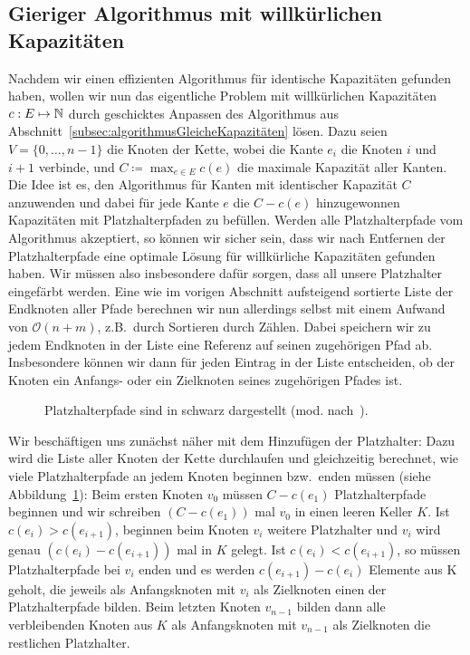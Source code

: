\subsection{Gieriger Algorithmus mit willkürlichen Kapazitäten}\label{subsec:anpassenAnWillkürlicheKapazitäten}

Nachdem wir einen effizienten Algorithmus für identische Kapazitäten gefunden haben, wollen wir nun das eigentliche Problem mit
willkürlichen Kapazitäten $c: E \mapsto \mathbb N$ durch geschicktes Anpassen des Algorithmus aus Abschnitt~\ref{subsec:algorithmusGleicheKapazitäten} lösen.
Dazu seien $V=\{0,\dots,n-1\}$ die Knoten der Kette, wobei die Kante $e_i$ die Knoten $i$ und $i+1$ verbinde, und $C \coloneqq \max_{e \in E} c(e)$ die maximale Kapazität aller Kanten.
Die Idee ist es, den Algorithmus für Kanten mit identischer Kapazität $C$ anzuwenden und dabei für jede Kante $e$ die $C - c(e)$
hinzugewonnen Kapazitäten mit Platzhalterpfaden zu befüllen.
Werden alle Platzhalterpfade vom Algorithmus akzeptiert, so können wir sicher sein, dass wir nach Entfernen der
Platzhalterpfade eine optimale Lösung für willkürliche Kapazitäten gefunden haben.
Wir müssen also insbesondere dafür sorgen, dass all unsere Platzhalter eingefärbt werden.
Eine wie im vorigen Abschnitt aufsteigend sortierte Liste der Endknoten aller Pfade berechnen wir nun allerdings selbst mit einem
Aufwand von $\mathcal O(n+m)$, z.B.\ durch Sortieren durch Zählen.
Dabei speichern wir zu jedem Endknoten in der Liste eine Referenz auf seinen zugehörigen Pfad ab.
Insbesondere können wir dann für jeden Eintrag in der Liste entscheiden, ob der Knoten ein Anfangs- oder ein Zielknoten seines zugehörigen Pfades ist.

\begin{figure}[htbp]
	\centering
	\def\svgwidth{250bp}
	
	\caption{Platzhalterpfade sind in schwarz dargestellt (mod. nach~\cite{paper}).}
	\label{fig:dummy-paths}
\end{figure}

Wir beschäftigen uns zunächst näher mit dem Hinzufügen der Platzhalter:
Dazu wird die Liste aller Knoten der Kette durchlaufen und gleichzeitig berechnet, wie viele Platzhalterpfade an jedem Knoten
beginnen bzw.\ enden müssen (siehe Abbildung~\ref{fig:dummy-paths}):
Beim ersten Knoten $v_0$ müssen $C - c(e_1)$ Platzhalterpfade beginnen und wir schreiben $(C - c(e_1))$ mal $v_0$ in einen
leeren Keller $K$.
Ist $c(e_i) > c(e_{i+1})$, beginnen beim Knoten $v_{i}$ weitere Platzhalter und $v_i$ wird genau $(c(e_i) - c(e_{i+1}))$ mal in $K$ gelegt.
Ist $c(e_i) < c(e_{i+1})$, so müssen Platzhalterpfade bei $v_i$ enden und es werden $c(e_{i+1}) - c(e_i)$ Elemente aus K geholt, die jeweils als Anfangsknoten mit $v_i$
als Zielknoten einen der Platzhalterpfade bilden.
Beim letzten Knoten $v_{n-1}$ bilden dann alle verbleibenden Knoten aus $K$ als Anfangsknoten mit $v_{n-1}$ als Zielknoten die restlichen Platzhalter.

